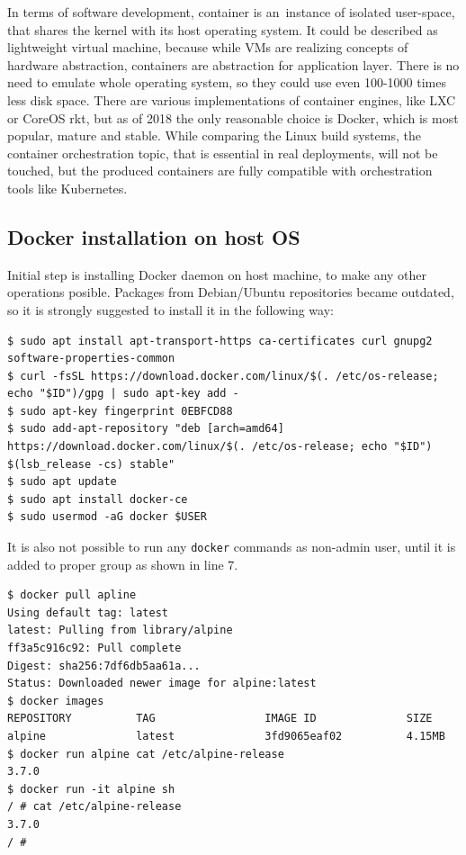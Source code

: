 \documentclass[printmode]{mgr}
\begin{document}
In terms of software development, container is an~instance of isolated user-space, that shares the kernel with its host operating system.\cite{web:what-container}
It could be described as lightweight virtual machine, because while VMs are realizing concepts of hardware abstraction, containers are abstraction for application layer.
There is no need to emulate whole operating system, so they could use even 100-1000 times less disk space.
There are various implementations of container engines, like LXC or CoreOS rkt, but as of 2018 the only reasonable choice is Docker, which is most popular, mature and stable.\cite{web:why-docker}
While comparing the Linux build systems, the container orchestration topic, that is essential in real deployments\cite{web:container-orchestration}, will not be touched, but the produced containers are fully compatible with orchestration tools like Kubernetes.

\subsection*{Docker installation on host OS}

Initial step is installing Docker daemon on host machine, to make any other operations posible.
Packages from Debian/Ubuntu repositories became outdated, so it is strongly suggested to install it in the following way:

\begin{lstlisting}
$ sudo apt install apt-transport-https ca-certificates curl gnupg2 software-properties-common
$ curl -fsSL https://download.docker.com/linux/$(. /etc/os-release; echo "$ID")/gpg | sudo apt-key add -
$ sudo apt-key fingerprint 0EBFCD88
$ sudo add-apt-repository "deb [arch=amd64] https://download.docker.com/linux/$(. /etc/os-release; echo "$ID") $(lsb_release -cs) stable"
$ sudo apt update
$ sudo apt install docker-ce
$ sudo usermod -aG docker $USER
\end{lstlisting}

It is also not possible to run any \verb|docker| commands as non-admin user, until it is added to proper group as shown in line 7. \cite{web:docker-permissions}

\begin{lstlisting}
$ docker pull apline
Using default tag: latest
latest: Pulling from library/alpine
ff3a5c916c92: Pull complete 
Digest: sha256:7df6db5aa61a...
Status: Downloaded newer image for alpine:latest
$ docker images
REPOSITORY          TAG                 IMAGE ID              SIZE
alpine              latest              3fd9065eaf02          4.15MB
$ docker run alpine cat /etc/alpine-release
3.7.0
$ docker run -it alpine sh
/ # cat /etc/alpine-release
3.7.0
/ #
\end{lstlisting}
\end{document}

